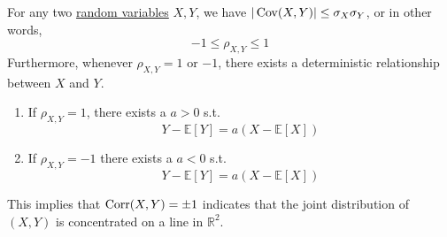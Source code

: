   \begin{theorem}
    \label{thm:cauchy-schwarz}
    For any two \hyperref[def:random-variable]{random variables} $X, Y$, we have $|\operatorname{Cov}(X, Y)| \leq \sigma_X \sigma_Y$, or in other words, 
    \begin{equation}
      -1 \leq \rho_{X, Y} \leq 1
    \end{equation}
    Furthermore, whenever $\rho_{X, Y} = 1$ or $-1$, there exists a deterministic relationship between $X$ and $Y$. 
    \begin{enumerate}
      \item If $\rho_{X, Y} = 1$, there exists a $a > 0$ s.t. 
      \begin{equation}
        Y - \mathbb{E}[Y] = a (X - \mathbb{E}[X])
      \end{equation}
      \item If $\rho_{X, Y} = -1$ there exists a $a < 0$ s.t. 
      \begin{equation}
        Y - \mathbb{E}[Y] = a (X - \mathbb{E}[X])
      \end{equation}
    \end{enumerate}
    This implies that $\operatorname{Corr}(X, Y) = \pm 1$ indicates that the joint distribution of $(X, Y)$ is concentrated on a line in $\mathbb{R}^2$. 
  \end{theorem}

